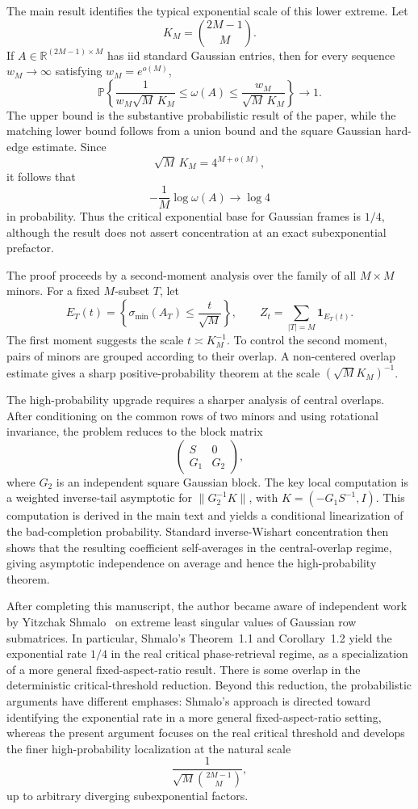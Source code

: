 \documentclass[11pt]{article}
\newcommand{\Pbb}{\mathbb P}
\newcommand{\1}{\mathbf 1}
\begin{document}
The main result identifies the typical exponential scale of this lower extreme.  Let
\[
        K_M=\binom{2M-1}{M}.
\]
If \(A\in\mathbb R^{(2M-1)\times M}\) has iid standard Gaussian entries, then
for every sequence \(w_M\to\infty\) satisfying \(w_M=e^{o(M)}\),
\[
        \Pbb\left\{
        \frac{1}{w_M\sqrt M\,K_M}
        \le
        \omega(A)
        \le
        \frac{w_M}{\sqrt M\,K_M}
        \right\}
        \longrightarrow1.
\]
The upper bound is the substantive probabilistic result of the paper, while
the matching lower bound follows from a union bound and the square Gaussian
hard-edge estimate.  Since
\[
        \sqrt M\,K_M=4^{M+o(M)},
\]
it follows that
\[
        -\frac1M\log\omega(A)\longrightarrow\log4
\]
in probability.  Thus the critical exponential base for Gaussian frames is
\(1/4\), although the result does not assert concentration at an exact
subexponential prefactor.

The proof proceeds by a second-moment analysis over the family of all
\(M\times M\) minors. For a fixed \(M\)-subset \(T\), let
\[
        E_T(t)=
        \left\{\sigma_{\min}(A_T)\le \frac{t}{\sqrt M}\right\},
        \qquad
        Z_t=\sum_{|T|=M}\mathbf 1_{E_T(t)}.
\]
The first moment suggests the scale \(t\asymp K_M^{-1}\). To control the second
moment, pairs of minors are grouped according to their overlap. A non-centered
overlap estimate gives a sharp positive-probability theorem at the scale
\((\sqrt M K_M)^{-1}\).

The high-probability upgrade requires a sharper analysis of central overlaps.
After conditioning on the common rows of two minors and using rotational
invariance, the problem reduces to the block matrix
\[
        \begin{pmatrix}
        S&0\\
        G_1&G_2
        \end{pmatrix},
\]
where \(G_2\) is an independent square Gaussian block. The key local computation
is a weighted inverse-tail asymptotic for \(\|G_2^{-1}K\|\), with
\(K=(-G_1S^{-1},I)\). This computation is derived in the main text and yields a
conditional linearization of the bad-completion probability. Standard
inverse-Wishart concentration then shows that the resulting coefficient
self-averages in the central-overlap regime, giving asymptotic independence on
average and hence the high-probability theorem.

After completing this manuscript, the author became aware of independent work by
Yitzchak Shmalo~\cite{Shmalo2026} on extreme least singular values of Gaussian
row submatrices. In particular, Shmalo's Theorem~1.1 and Corollary~1.2 yield the exponential rate
\(1/4\) in the real critical phase-retrieval regime, as a specialization of a
more general fixed-aspect-ratio result. There is some overlap in the deterministic
critical-threshold reduction. Beyond this reduction, the probabilistic arguments
have different emphases: Shmalo's approach is directed toward identifying the
exponential rate in a more general fixed-aspect-ratio setting, whereas the present
argument focuses on the real critical threshold and develops the finer
high-probability localization at the natural scale
\[
    \frac{1}{\sqrt{M}\binom{2M-1}{M}},
\]
up to arbitrary diverging subexponential factors.
\end{document}
